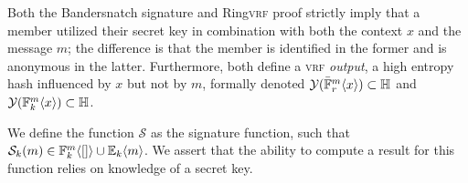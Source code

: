 Both the Bandersnatch signature and Ring\textsc{vrf} proof strictly imply that a member utilized their secret key in combination with both the context $x$ and the message $m$; the difference is that the member is identified in the former and is anonymous in the latter. Furthermore, both define a \textsc{vrf} \emph{output}, a high entropy hash influenced by $x$ but not by $m$, formally denoted $\banderout{\bandersnatch{r}{x}{m}} \subset \H$ and $\banderout{\bandersig{k}{x}{m}} \subset \H$.

We define the function $\mathcal{S}$ as the signature function, such that $\mathcal{S}_{k}(m) \in \bandersig{k}{[]}{m} \cup \sig{k}{m}$. We assert that the ability to compute a result for this function relies on knowledge of a secret key.
